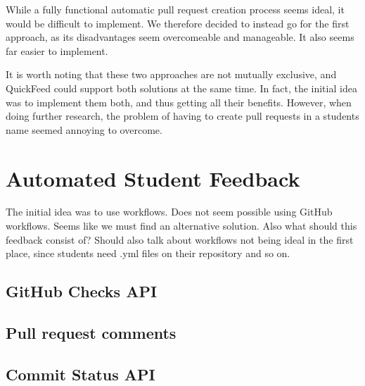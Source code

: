 While a fully functional automatic pull request creation process seems ideal, it would be difficult to implement.
We therefore decided to instead go for the first approach, as its disadvantages seem overcomeable and manageable.
It also seems far easier to implement.

It is worth noting that these two approaches are not mutually exclusive, and QuickFeed could support both solutions at the same time.
In fact, the initial idea was to implement them both, and thus getting all their benefits.
However, when doing further research, the problem of having to create pull requests in a students name seemed annoying to overcome.

\section{Automated Student Feedback}

The initial idea was to use workflows.
Does not seem possible using GitHub workflows.
Seems like we must find an alternative solution.
Also what should this feedback consist of?
Should also talk about workflows not being ideal in the first place, since students need .yml files on their repository and so on.

\subsection{GitHub Checks API}

\subsection{Pull request comments}

\subsection{Commit Status API}